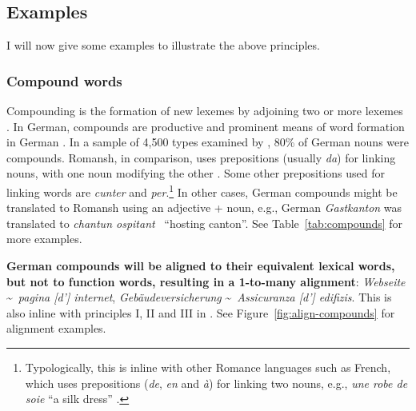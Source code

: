 

\subsection{Examples}\label{sec:gold-standard-examples}
I will now give some examples to illustrate the above principles.
\subsubsection{Compound words}
Compounding is the formation of new lexemes by adjoining two or more lexemes \autocite{bauer1988}. In German, compounds are productive and prominent means of word formation in German \autocite{clematide2018}. 
In a sample of 4,500 types examined by \textcite{clematide2018}, 80\% of German nouns were compounds.
Romansh, in comparison, uses prepositions (usually \emph{da}) for linking nouns, with one noun modifying the other \autocite{valladers}. Some other prepositions used for linking words are \emph{cunter} and \emph{per}.\footnote{Typologically, this is inline with other Romance languages such as French, which uses prepositions (\emph{de}, \emph{en} and \emph{à}) for linking two nouns, e.g., \emph{une robe de soie} \enquote{a silk dress} \autocite[510]{price2008}.}
In other cases, German compounds might be translated to Romansh using an adjective + noun, e.g., German \emph{Gastkanton} was translated to \emph{chantun ospitant} ~\enquote{hosting canton}.
See Table~\ref{tab:compounds} for more examples.

\textbf{German compounds will be aligned to their equivalent lexical words, but not to function words, resulting in a 1-to-many alignment}: \emph{Webseite} \textasciitilde~\emph{pagina [d'] internet}, \emph{Gebäudeversicherung} \textasciitilde~\emph{Assicuranza [d'] edifizis}. 
This is also inline with principles I, II and III in \textcite{clematide2018}. 
See Figure~\ref{fig:align-compounds} for alignment examples.

